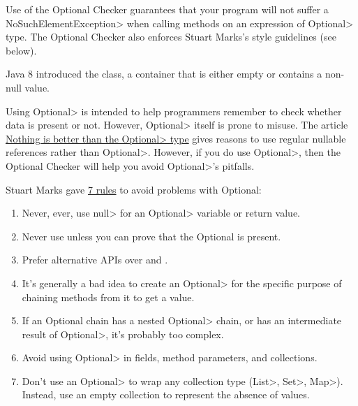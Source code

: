 \htmlhr
{}

Use of the Optional Checker guarantees that your program will not suffer
a \<NoSuchElementException> when calling
methods on an expression of \<Optional> type.
The Optional Checker also enforces Stuart Marks's style guidelines (see below).

Java 8 introduced the 
class, a container that is either empty or contains a non-null value.

Using \<Optional> is intended to help programmers remember to check whether
data is present or not.  However, \<Optional> itself is prone to misuse.
The article
\href{https://homes.cs.washington.edu/~mernst/advice/nothing-is-better-than-optional.html}{Nothing
  is better than the \<Optional> type} gives reasons to use
regular nullable references rather than \<Optional>.  However, if you do use
\<Optional>, then the Optional Checker will help you avoid
\<Optional>'s pitfalls.

Stuart Marks gave
\href{https://stuartmarks.wordpress.com/2016/09/27/vjug24-session-on-optional/}{7
  rules} to avoid problems with Optional:
\begin{enumerate}
\item
  Never, ever, use \<null> for an \<Optional> variable or return value.
\item
  Never use  unless you can prove that the Optional is present.
\item
  Prefer alternative APIs over
  and .
\item
  It's generally a bad idea to create an \<Optional> for the specific
  purpose of chaining methods from it to get a value.
\item
  If an Optional chain has a nested \<Optional> chain, or has an
  intermediate result of \<Optional>, it's probably too complex.
\item
  Avoid using \<Optional> in fields, method parameters, and collections.
\item
  Don't use an \<Optional> to wrap any collection type (\<List>, \<Set>,
  \<Map>).  Instead, use an empty collection to represent the absence of
  values.
\end{enumerate}


